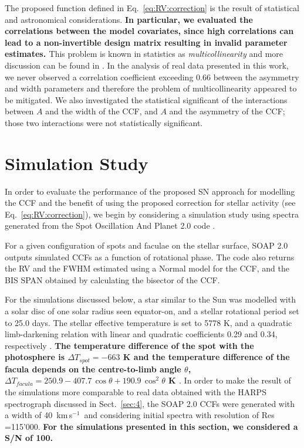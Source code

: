 \documentclass{aa}
\def\kms{\hbox{\,km\,s$^{-1}$}}       %
\begin{document}
The proposed function defined in Eq.~\eqref{eq:RV:correction} is the result of statistical and astronomical considerations. 
{\bf{ In particular, we evaluated the correlations between the model covariates, since high correlations can lead to a non-invertible design matrix resulting in invalid parameter estimates. }}This problem is known in statistics as \textit{multicollinearity} and more discussion can be found in \citet{belsley1991}.
In the analysis of real data presented in this work, we never observed a correlation coefficient exceeding $0.66$ between the asymmetry and width parameters and therefore the problem of multicollinearity appeared to be mitigated. 
We also investigated the statistical significant of the interactions between $A$ and the width of the CCF, and $A$ and the asymmetry of the CCF; those two interactions were not statistically significant.

\section{Simulation Study} \label{sec:soap}
In order to evaluate the performance of the proposed SN approach for modelling the CCF and the benefit of using the proposed correction for stellar activity (see Eq.~\eqref{eq:RV:correction}), we begin by considering a simulation study using spectra generated from the Spot Oscillation And Planet 2.0 code \citep[SOAP 2.0,][]{Dumusque-2014b}.

For a given configuration of spots and faculae on the stellar surface, SOAP 2.0 outputs simulated CCFs as a function of rotational phase. 
The code also returns the RV and the FWHM estimated using a Normal model for the CCF, and the BIS SPAN obtained by calculating the bisector of the CCF. 

For the simulations discussed below, a star similar to the Sun was modelled with a solar disc of one solar radius seen equator-on, and a stellar rotational period set to 25.0 days.
The stellar effective temperature is set to 5778 K, and a quadratic limb-darkening relation with linear and quadratic coefficients 0.29 and 0.34, respectively \citep[][]{Oshagh-2013a, Claret-2011}. {\bf The temperature difference of the spot with the photosphere is $\Delta T_{spot} = -663$ K and the temperature difference of the facula depends on the centre-to-limb angle $\theta$,  $\Delta T_{facula} = 250.9 - 407.7\,\cos{\theta} + 190.9\,\cos^2 \theta$ K \citep[][]{Meunier-2010a}}.
In order to make the result of the simulations more comparable to real data obtained with the HARPS spectrograph discussed in Sect.~\ref{sec:4}, the SOAP 2.0 CCFs were generated with a width of 40 \kms\, and considering initial spectra with resolution of Res =115'000.
{\bf{ For the simulations presented in this section, we considered a S/N of 100.}}
\end{document}
